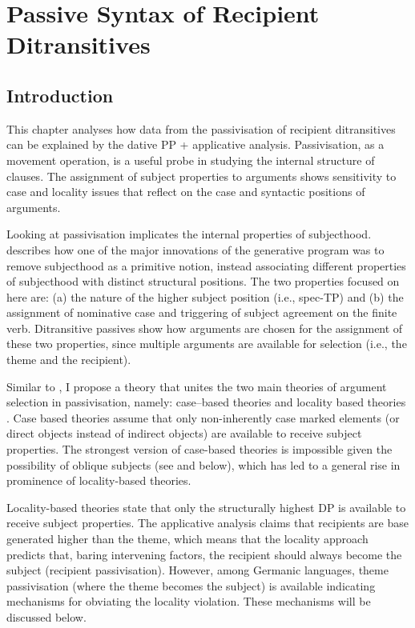 \chapter{Passive Syntax of Recipient Ditransitives}\label{ch:passive}
\section{Introduction}
This chapter analyses how data from the passivisation of recipient ditransitives can be explained by the dative PP + applicative analysis. Passivisation, as a movement operation, is a useful probe in studying the internal structure of clauses. The assignment of subject properties to arguments shows sensitivity to case and locality issues that reflect on the case and syntactic positions of arguments.

Looking at passivisation implicates the internal properties of subjecthood. \cite{McCloskey.1997} describes how one of the major innovations of the generative program was to remove subjecthood as a primitive notion, instead associating different properties of subjecthood with distinct structural positions. The two properties focused on here are: (a) the nature of the higher subject position (i.e., spec-TP) and (b) the assignment of nominative case and triggering of subject agreement on the finite verb. Ditransitive passives show how arguments are chosen for the assignment of these two properties, since multiple arguments are available for selection (i.e., the theme and the recipient).

Similar to \cite{Platzack.2005}, I propose a theory that unites the two main theories of argument selection in passivisation, namely: case--based theories \citep{Larson.1988,Baker.1988,Pesetsky.1996,Holmberg.2001} and locality based theories \citep{Falk.1990,Holmberg.1995,McGinnis.1998,Anagnostopoulou.2003}.  Case based theories assume that only non-inherently case marked elements (or direct objects instead of indirect objects) are available to receive subject properties. The strongest version of case-based theories is impossible given the possibility of oblique subjects (see \citealt{Zaenen.1985} and below), which has led to a general rise in prominence of locality-based theories.

Locality-based theories state that only the structurally highest DP is available to receive subject properties. The applicative analysis claims that recipients are base generated higher than the theme, which means that the locality approach predicts that, baring intervening factors, the recipient should always become the subject (recipient passivisation). However, among Germanic languages, theme passivisation (where the theme becomes the subject) is available indicating mechanisms for obviating the locality violation. These mechanisms will be discussed below.

